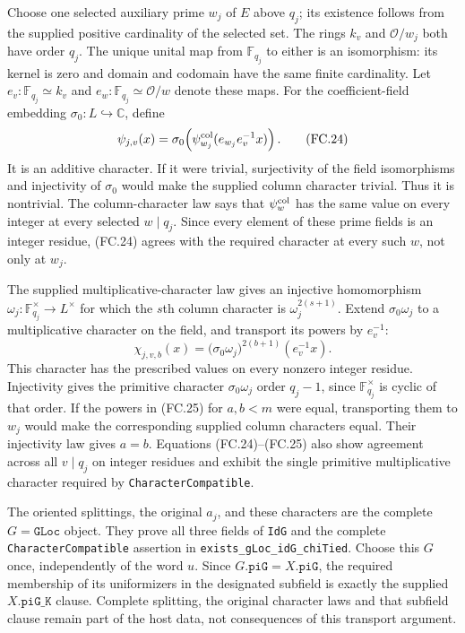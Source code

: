 Choose one selected auxiliary prime $w_j$ of $E$ above $q_j$; its
existence follows from the supplied positive cardinality of the selected
set. The rings $k_v$ and $\mathcal O/w_j$ both have order $q_j$.
The unique unital map from $\mathbb F_{q_j}$ to either is an
isomorphism: its kernel is zero and domain and codomain have the same
finite cardinality. Let $e_v:\mathbb F_{q_j}\simeq k_v$ and
$e_w:\mathbb F_{q_j}\simeq\mathcal O/w$ denote these maps.
For the coefficient-field embedding $\sigma_0:L\hookrightarrow\mathbb C$,
define
\[
 \psi_{j,v}(x)=\sigma_0\!\left(
       \psi^{\rm col}_{w_j}(e_{w_j}e_v^{-1}x)\right).
 \tag{FC.24}
\]
It is an additive character. If it were trivial, surjectivity of the
field isomorphisms and injectivity of $\sigma_0$ would make the supplied
column character trivial. Thus it is nontrivial. The column-character
law says that $\psi^{\rm col}_w$ has the same value on every integer
at every selected $w\mid q_j$. Since every element of these prime
fields is an integer residue, (FC.24) agrees with the required character
at every such $w$, not only at $w_j$.

The supplied multiplicative-character law gives an injective homomorphism
$\omega_j:\mathbb F_{q_j}^{\times}\to L^{\times}$ for which
the $s$th column character is $\omega_j^{2(s+1)}$.
Extend $\sigma_0\omega_j$ to a multiplicative character on the field,
and transport its powers by $e_v^{-1}$:
\[
 \chi_{j,v,b}(x)
       =\bigl(\sigma_0\omega_j\bigr)^{2(b+1)}(e_v^{-1}x).
 \tag{FC.25}
\]
This character has the prescribed values on every nonzero integer
residue. Injectivity gives the primitive character
$\sigma_0\omega_j$ order $q_j-1$, since
$\mathbb F_{q_j}^{\times}$ is cyclic of that order. If the powers
in (FC.25) for $a,b<m$ were equal, transporting them to $w_j$ would
make the corresponding supplied column characters equal. Their
injectivity law gives $a=b$. Equations (FC.24)--(FC.25) also show
agreement across all $v\mid q_j$ on integer residues and exhibit the
single primitive multiplicative character required by
\texttt{CharacterCompatible}.

The oriented splittings, the original $a_j$, and these characters are
the complete $G=\texttt{GLoc}$ object. They prove all three fields of
\texttt{IdG} and the complete \texttt{CharacterCompatible} assertion
in \texttt{exists\_gLoc\_idG\_chiTied}. Choose this $G$ once,
independently of the word $u$. Since $G.\texttt{piG}=X.\texttt{piG}$,
the required membership of its uniformizers in the designated subfield
is exactly the supplied $X.\texttt{piG\_K}$ clause. Complete splitting,
the original character laws and that subfield clause remain part of
the host data, not consequences of this transport argument.

